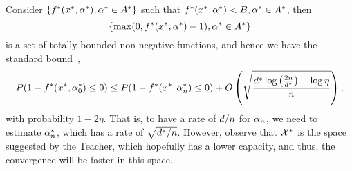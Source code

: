 Consider $\left\{f^*(x^*, \alpha^*), \alpha^* \in A^*\right\}$ such that $f^*(x^*, \alpha^*) < B, \alpha^* \in A^*$, then 
$$\left\{\max(0, f^*(x^*, \alpha^*)- 1), \alpha^* \in A^*\right\}$$
 is a set of totally bounded non-negative functions, and hence we have the standard bound~\citep{Vapnik00},
\begin{equation}
    \nonumber
    P(1 - f^*(x^*, \alpha^*_0) \leq 0) \leq P(1 - f^*(x^*, \alpha^*_n) \leq 0) + O\left( \sqrt{\frac{d^* \log\left(\frac{2n}{d^*} \right) - \log\eta}{n}}  \right) ,
\end{equation}
with probability $1 - 2\eta$.
That is, to have a rate of $d/n$ for $\alpha_n$, we need to estimate $\alpha^*_n$, which has a rate of $\sqrt{d^*/n}$. However, observe that $\mathcal{X}^*$ is the space suggested by the Teacher, which hopefully has a lower capacity, and thus, the convergence will be faster in this space.


